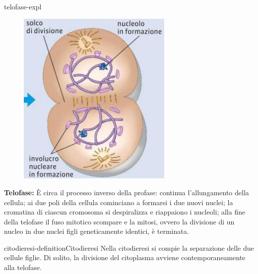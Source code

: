 \documentclass[preview]{standalone}
\begin{document}
\begin{snippet}{telofase-expl}
    \setlength{\intextsep}{0pt}%
    \begin{figure}
        \includegraphics[width=7.5cm]{./resources/telofase.jpg}
        \vspace{-1cm}
    \end{figure}

    \textbf{Telofase:}
    È circa il processo inverso della profase: continua l'allungamento della cellula; ai due poli
    della cellula cominciano a formarsi i due nuovi nuclei; la cromatina di ciascun cromosoma
    si despiralizza e riappaiono i nucleoli; alla fine della telofase il fuso mitotico scompare e la
    mitosi, ovvero la divisione di un nucleo in due nuclei figli geneticamente identici, è terminata.
    \wrapfill
\end{snippet}

\begin{snippetdefinition}{citodieresi-definition}{Citodieresi}
    Nella citodieresi si compie la separazione delle due cellule figlie. Di solito, la divisione del
citoplasma avviene contemporaneamente alla telofase.
\end{snippetdefinition}
\end{document}
